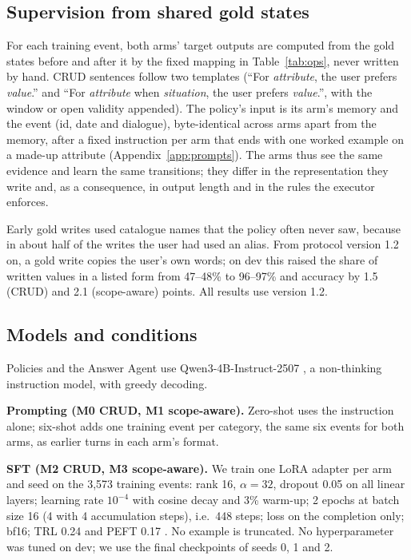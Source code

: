 \documentclass[11pt]{article}
\begin{document}
\subsection{Supervision from shared gold states}
For each training event, both arms' target outputs are computed from the gold states before and after it by the fixed mapping in Table~\ref{tab:ops}, never written by hand. CRUD sentences follow two templates (``For \emph{attribute}, the user prefers \emph{value}.'' and ``For \emph{attribute} when \emph{situation}, the user prefers \emph{value}.'', with the window or open validity appended). The policy's input is its arm's memory and the event (id, date and dialogue), byte-identical across arms apart from the memory, after a fixed instruction per arm that ends with one worked example on a made-up attribute (Appendix~\ref{app:prompts}). The arms thus see the same evidence and learn the same transitions; they differ in the representation they write and, as a consequence, in output length and in the rules the executor enforces.

Early gold writes used catalogue names that the policy often never saw, because in about half of the writes the user had used an alias. From protocol version 1.2 on, a gold write copies the user's own words; on dev this raised the share of written values in a listed form from 47--48\% to 96--97\% and accuracy by 1.5 (CRUD) and 2.1 (scope-aware) points. All results use version 1.2.

\subsection{Models and conditions}
Policies and the Answer Agent use Qwen3-4B-Instruct-2507 \citep{yang2025qwen3}, a non-thinking instruction model, with greedy decoding.

\textbf{Prompting (M0 CRUD, M1 scope-aware).} Zero-shot uses the instruction alone; six-shot adds one training event per category, the same six events for both arms, as earlier turns in each arm's format.

\textbf{SFT (M2 CRUD, M3 scope-aware).} We train one LoRA adapter \citep{hu2022lora} per arm and seed on the 3,573 training events: rank 16, $\alpha=32$, dropout 0.05 on all linear layers; learning rate $10^{-4}$ with cosine decay and 3\% warm-up; 2 epochs at batch size 16 (4 with 4 accumulation steps), i.e.\ 448 steps; loss on the completion only; bf16; TRL 0.24 \citep{vonwerra2020trl} and PEFT 0.17 \citep{mangrulkar2022peft}. No example is truncated. No hyperparameter was tuned on dev; we use the final checkpoints of seeds 0, 1 and 2.
\end{document}
